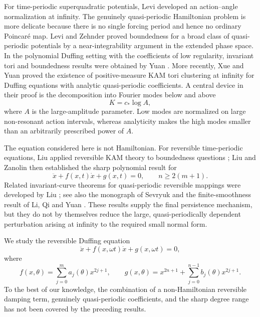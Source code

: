\documentclass[11pt]{amsart}
\theoremstyle{remark}
\begin{document}
For time-periodic superquadratic potentials, Levi
\cite{Levi1991} developed an action--angle normalization at infinity.
The genuinely quasi-periodic Hamiltonian problem is more delicate because
there is no single forcing period and hence no ordinary Poincar\'e map.
Levi and Zehnder \cite{LeviZehnder} proved boundedness for a broad class of
quasi-periodic potentials by a near-integrability argument in the extended
phase space.  In the polynomial Duffing setting with the coefficients of low regularity, invariant tori and
boundedness results were obtained by Yuan \cite{Yuan1998}.  More recently,
Xue and Yuan \cite{XueYuan} proved the existence of positive-measure KAM
tori clustering at infinity for Duffing equations with analytic
quasi-periodic coefficients.  A central device in their proof is the
decomposition into Fourier modes below and above
\[
 K=c_*\log A,
\]
where $A$ is the large-amplitude parameter.  Low modes are normalized on
large non-resonant action intervals, whereas analyticity makes the high
modes smaller than an arbitrarily prescribed power of $A$.

The equation considered here is not Hamiltonian.  For reversible
time-periodic equations, Liu applied reversible KAM theory to boundedness
questions \cite{Liu1991}; Liu and Zanolin \cite{LiuZanolin} then established
the sharp polynomial result for
\[
 \ddot x+f(x,t)\dot x+g(x,t)=0,
\qquad n\geq2(m+1).
\]
Related invariant-curve theorems for quasi-periodic reversible mappings
were developed by Liu \cite{Liu2005}; see also the monograph of Sevryuk
\cite{Sevryuk} and the finite-smoothness result of Li, Qi and Yuan
\cite{LiQiYuan}.  These results supply the final persistence mechanism, but
they do not by themselves reduce the large, quasi-periodically dependent
perturbation arising at infinity to the required small normal form.

We study the reversible Duffing equation
\begin{equation}\label{eq:main}
 \ddot x+f(x,\omega t)\dot x+g(x,\omega t)=0,
\end{equation}
where
\begin{equation}\label{eq:fg}
 f(x,\theta)=\sum_{j=0}^{m}a_j(\theta)x^{2j+1},\qquad
 g(x,\theta)=x^{2n+1}+\sum_{j=0}^{n-1}b_j(\theta)x^{2j+1}.
\end{equation}
To the best of our knowledge, the combination of a non-Hamiltonian
reversible damping term, genuinely quasi-periodic coefficients, and the
sharp degree range has not been covered by the preceding results.
\end{document}
